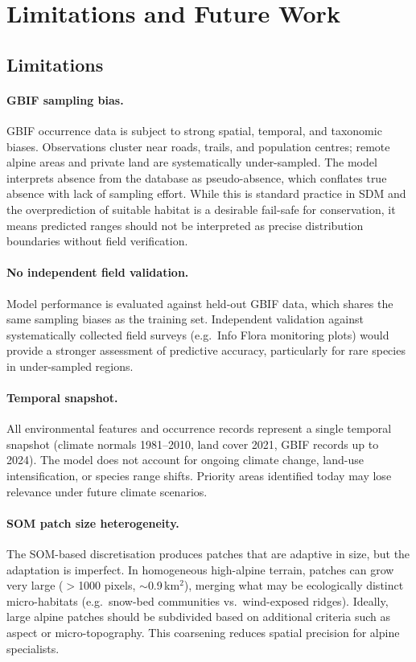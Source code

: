 \section{Limitations and Future Work}
\label{sec:limitations}

\subsection{Limitations}
\label{sec:limit-detail}

\paragraph{GBIF sampling bias.}
GBIF occurrence data is subject to strong spatial,
temporal, and taxonomic biases. Observations cluster near
roads, trails, and population centres; remote alpine areas
and private land are systematically under-sampled. The
model interprets absence from the database as
pseudo-absence, which conflates true absence with lack of
sampling effort. While this is standard practice in SDM
and the overprediction of suitable habitat is a
desirable fail-safe for conservation, it means predicted
ranges should not be interpreted as precise distribution
boundaries without field verification.

\paragraph{No independent field validation.}
Model performance is evaluated against held-out GBIF data,
which shares the same sampling biases as the training set.
Independent validation against systematically collected
field surveys (e.g.\ Info Flora monitoring plots) would
provide a stronger assessment of predictive accuracy,
particularly for rare species in under-sampled regions.

\paragraph{Temporal snapshot.}
All environmental features and occurrence records represent
a single temporal snapshot (climate normals 1981--2010,
land cover 2021, GBIF records up to 2024). The model does
not account for ongoing climate change, land-use
intensification, or species range shifts. Priority areas
identified today may lose relevance under future climate
scenarios.

\paragraph{SOM patch size heterogeneity.}
The SOM-based discretisation produces patches that are
adaptive in size, but the adaptation is imperfect. In
homogeneous high-alpine terrain, patches can grow very
large ($>$1000 pixels, ${\sim}$0.9\,km$^2$), merging what
may be ecologically distinct micro-habitats (e.g.\
snow-bed communities vs.\ wind-exposed ridges). Ideally,
large alpine patches should be subdivided based on
additional criteria such as aspect or micro-topography.
This coarsening reduces spatial precision for alpine
specialists.

